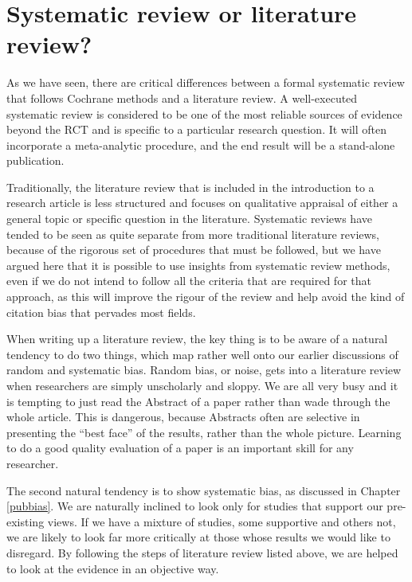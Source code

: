 \documentclass{krantz}
\begin{document}
\hypertarget{systematic-review-or-literature-review}{%
\section{Systematic review or literature review?}\label{systematic-review-or-literature-review}}

As we have seen, there are critical differences between a formal systematic review that follows Cochrane methods and a literature review. A well-executed systematic review is considered to be one of the most reliable sources of evidence beyond the RCT and is specific to a particular research question. It will often incorporate a meta-analytic procedure, and the end result will be a stand-alone publication.

Traditionally, the literature review that is included in the introduction to a research article is less structured and focuses on qualitative appraisal of either a general topic or specific question in the literature. Systematic reviews have tended to be seen as quite separate from more traditional literature reviews, because of the rigorous set of procedures that must be followed, but we have argued here that it is possible to use insights from systematic review methods, even if we do not intend to follow all the criteria that are required for that approach, as this will improve the rigour of the review and help avoid the kind of citation bias that pervades most fields.

When writing up a literature review, the key thing is to be aware of a natural tendency to do two things, which map rather well onto our earlier discussions of random and systematic bias. Random bias, or noise, gets into a literature review when researchers are simply unscholarly and sloppy. We are all very busy and it is tempting to just read the Abstract of a paper rather than wade through the whole article. This is dangerous, because Abstracts often are selective in presenting the ``best face'' of the results, rather than the whole picture. Learning to do a good quality evaluation of a paper is an important skill for any researcher.

The second natural tendency is to show systematic bias, as discussed in Chapter \ref{pubbias}. We are naturally inclined to look only for studies that support our pre-existing views. If we have a mixture of studies, some supportive and others not, we are likely to look far more critically at those whose results we would like to disregard. By following the steps of literature review listed above, we are helped to look at the evidence in an objective way.
\end{document}
